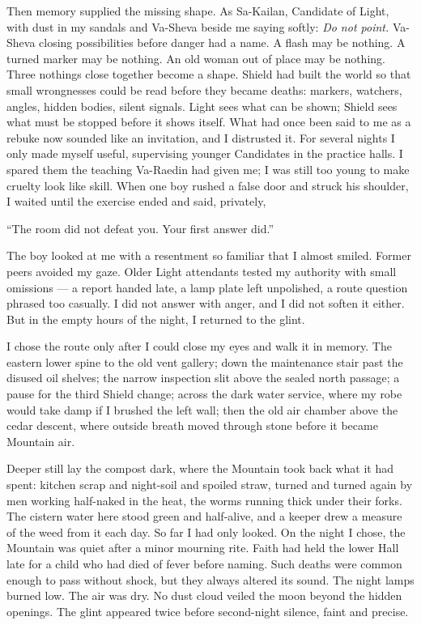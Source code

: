 Then memory supplied the missing shape. As Sa-Kailan, Candidate of Light, with dust in my sandals and Va-Sheva beside me saying softly: \textit{Do not point.} Va-Sheva closing possibilities before danger had a name. A flash may be nothing. A turned marker may be nothing. An old woman out of place may be nothing. Three nothings close together become a shape. Shield had built the world so that small wrongnesses could be read before they became deaths: markers, watchers, angles, hidden bodies, silent signals. Light sees what can be shown; Shield sees what must be stopped before it shows itself. What had once been said to me as a rebuke now sounded like an invitation, and I distrusted it. For several nights I only made myself useful, supervising younger Candidates in the practice halls. I spared them the teaching Va-Raedin had given me; I was still too young to make cruelty look like skill. When one boy rushed a false door and struck his shoulder, I waited until the exercise ended and said, privately,\par

``The room did not defeat you. Your first answer did.''\par

The boy looked at me with a resentment so familiar that I almost smiled. Former peers avoided my gaze. Older Light attendants tested my authority with small omissions --- a report handed late, a lamp plate left unpolished, a route question phrased too casually. I did not answer with anger, and I did not soften it either. But in the empty hours of the night, I returned to the glint. \par

I chose the route only after I could close my eyes and walk it in memory. The eastern lower spine to the old vent gallery; down the maintenance stair past the disused oil shelves; the narrow inspection slit above the sealed north passage; a pause for the third Shield change; across the dark water service, where my robe would take damp if I brushed the left wall; then the old air chamber above the cedar descent, where outside breath moved through stone before it became Mountain air.\par

Deeper still lay the compost dark, where the Mountain took back what it had spent: kitchen scrap and night-soil and spoiled straw, turned and turned again by men working half-naked in the heat, the worms running thick under their forks. The cistern water here stood green and half-alive, and a keeper drew a measure of the weed from it each day.
So far I had only looked. On the night I chose, the Mountain was quiet after a minor mourning rite. Faith had held the lower Hall late for a child who had died of fever before naming. Such deaths were common enough to pass without shock, but they always altered its sound. The night lamps burned low. The air was dry. No dust cloud veiled the moon beyond the hidden openings. The glint appeared twice before second-night silence, faint and precise.\par

